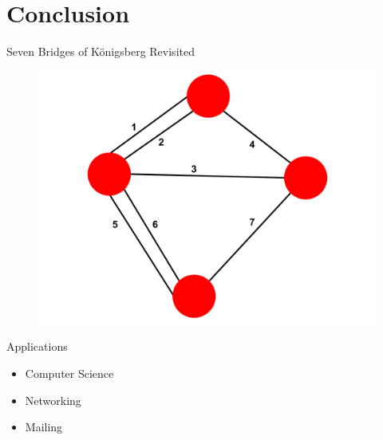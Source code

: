 \documentclass{beamer}
\begin{document}
\section{Conclusion}

\begin{frame}{Seven Bridges of K\"{o}nigsberg Revisited}
	\begin{figure}
		\centering
		\includegraphics[scale=.35]{pictures/konigsberg.pdf}
	\end{figure}
\end{frame}

\begin{frame}{Applications}
	\begin{itemize}
		\item<1-> Computer Science
		\item<2-> Networking
		\item<3-> Mailing 
	\end{itemize}
\end{frame}

\end{document}
